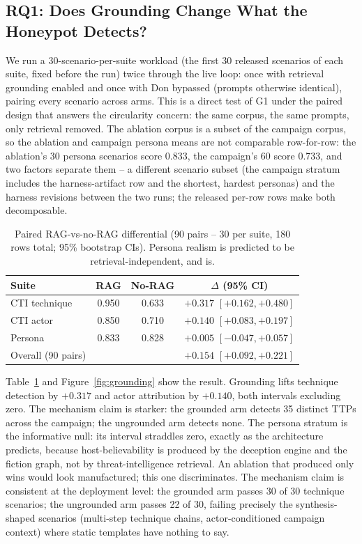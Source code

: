 \subsection{RQ1: Does Grounding Change What the Honeypot Detects?}
\label{sec:rq1}

We run a 30-scenario-per-suite workload (the first 30 released
scenarios of each suite, fixed before the run) twice through the live
loop: once with retrieval grounding enabled and once with Don bypassed
(prompts otherwise identical), pairing every scenario across arms. This
is a direct test of G1 under the paired design that answers the
circularity concern: the same corpus, the same prompts, only retrieval
removed. The ablation corpus is a subset of the campaign corpus, so
the ablation and campaign persona means are not comparable row-for-row:
the ablation's 30 persona scenarios score 0.833, the campaign's 60
score 0.733, and two factors separate them -- a different scenario
subset (the campaign stratum includes the harness-artifact row and the
shortest, hardest personas) and the harness revisions between the
two runs; the released per-row rows make both decomposable.

\begin{table}[t]
\centering
\caption{Paired RAG-vs-no-RAG differential (90 pairs -- 30 per suite,
180 rows total; 95\% bootstrap CIs). Persona realism is predicted to be
retrieval-independent, and is.}
\label{tab:b4}
\begin{tabular}{lccc}
\toprule
Suite & RAG & No-RAG & $\Delta$ (95\% CI) \\
\midrule
CTI technique & 0.950 & 0.633 & $+0.317$ $[+0.162, +0.480]$ \\
CTI actor     & 0.850 & 0.710 & $+0.140$ $[+0.083, +0.197]$ \\
Persona       & 0.833 & 0.828 & $+0.005$ $[-0.047, +0.057]$ \\
\midrule
Overall (90 pairs) & & & $+0.154$ $[+0.092, +0.221]$ \\
\bottomrule
\end{tabular}
\end{table}


Table~\ref{tab:b4} and Figure~\ref{fig:grounding} show the result.
Grounding lifts technique detection
by $+0.317$ and actor attribution by $+0.140$, both intervals excluding
zero. The mechanism claim is starker: the grounded arm detects 35 distinct
TTPs across the campaign; the ungrounded arm detects none. The persona
stratum is the informative null: its interval straddles zero, exactly as
the architecture predicts, because host-believability is produced by the
deception engine and the fiction graph, not by threat-intelligence
retrieval. An ablation that produced only wins would look manufactured;
this one discriminates. The mechanism claim is consistent at the
deployment level: the grounded arm passes 30 of 30 technique scenarios;
the ungrounded arm passes 22 of 30, failing precisely the
synthesis-shaped scenarios (multi-step technique chains, actor-conditioned
campaign context) where static templates have nothing to say.

